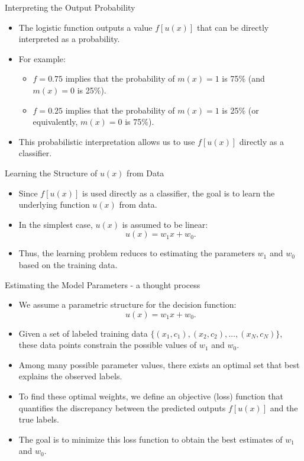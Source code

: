 \documentclass{beamer}
\begin{document}
\begin{frame}{Interpreting the Output Probability}
  \begin{itemize}
    \item The logistic function outputs a value \( f[u(x)] \) that can be directly interpreted as a probability.
    \item For example:
      \begin{itemize}
        \item \( f = 0.75 \) implies that the probability of \( m(x)=1 \) is 75\% (and \( m(x)=0 \) is 25\%).
        \item \( f = 0.25 \) implies that the probability of \( m(x)=1 \) is 25\% (or equivalently, \( m(x)=0 \) is 75\%).
      \end{itemize}
    \item This probabilistic interpretation allows us to use \( f[u(x)] \) directly as a classifier.
  \end{itemize}
\end{frame}

\begin{frame}{Learning the Structure of \( u(x) \) from Data}
  \begin{itemize}
    \item Since \( f[u(x)] \) is used directly as a classifier, the goal is to learn the underlying function \( u(x) \) from data.
    \item In the simplest case, \( u(x) \) is assumed to be linear:
      \[
      u(x) = w_1 x + w_0.
      \]
    \item Thus, the learning problem reduces to estimating the parameters \( w_1 \) and \( w_0 \) based on the training data.
  \end{itemize}
\end{frame}


\begin{frame}{Estimating the Model Parameters - a thought process}
  \begin{itemize}
    \item We assume a parametric structure for the decision function: 
      \[
      u(x) = w_1 x + w_0.
      \]
    \item Given a set of labeled training data \( \{(x_1, c_1), (x_2, c_2), \dots, (x_N, c_N)\} \), these data points constrain the possible values of \( w_1 \) and \( w_0 \).
    \item Among many possible parameter values, there exists an optimal set that best explains the observed labels.
    \item To find these optimal weights, we define an objective (loss) function that quantifies the discrepancy between the predicted outputs \( f[u(x)] \) and the true labels.
    \item The goal is to minimize this loss function to obtain the best estimates of \( w_1 \) and \( w_0 \).
  \end{itemize}
\end{frame}
\end{document}
